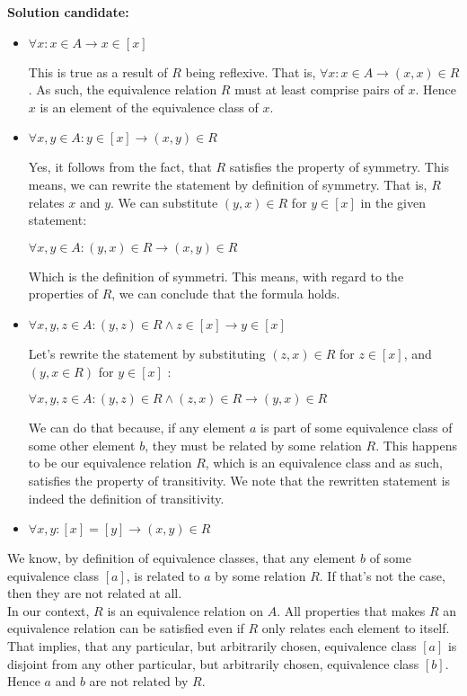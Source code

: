 \documentclass{report}
\newcommand{\cent}[1]{\begin{center}#1\end{center}}
\newcommand{\In}{\! \in \!}
\newcommand{\solution}{\textbf{Solution candidate: }}
\begin{document}
	\solution
	\begin{itemize}
		\item $\forall x : x \In A \to x \In [x]$
		
		This is true as a result of $R$ being reflexive. That is, $\forall x : x \In A \to (x,x) \In R$. As such, the equivalence relation $R$ must at least comprise pairs of $x$. Hence $x$ is an element of the equivalence class of $x$.
		
		\item $\forall x,y \In A : y \In [x] \to (x,y) \In R$
		
		Yes, it follows from the fact, that $R$ satisfies the property of symmetry. This means, we can rewrite the statement by definition of symmetry. That is, $R$ relates $x$ and $y$. We can substitute $(y,x)\In R$ for $y \In [x]$ in the given statement:
		
		\cent{$\forall x,y \In A : (y,x) \In R \to (x,y) \In R$}
		
		Which is the definition of symmetri. This means, with regard to the properties of $R$, we can conclude that the formula holds.
		
		\item $\forall x,y,z \In A : (y,z) \In R \wedge z \In [x] \to y \In [x]$
		
		Let's rewrite the statement by substituting $(z,x)\In R$ for $z \In [x]$, and $(y,x \In R)$ for $y \In [x]$ :
		
		\cent{$\forall x,y,z \In A : (y,z) \In R \wedge (z,x)\In R \to (y,x) \In R$}
		
		We can do that because, if any element $a$ is part of some equivalence class of some other element $b$, they must be related by some relation $R$. This happens to be our equivalence relation $R$, which is an equivalence class and as such, satisfies the property of transitivity. We note that the rewritten statement is indeed the definition of transitivity.
		
		\item $\forall x,y : [x] = [y] \to (x,y)\In R$
	\end{itemize}
		
	We know, by definition of equivalence classes, that any element $b$ of some equivalence class $[a]$, is related to $a$ by some relation $R$. If that's not the case, then they are not related at all.\\ 
	
	In our context, $R$ is an equivalence relation on $A$. All properties that makes $R$ an equivalence relation can be satisfied even if $R$ only relates each element to itself. That implies, that any particular, but arbitrarily chosen, equivalence class $[a]$ is disjoint from any other particular, but arbitrarily chosen, equivalence class $[b]$. Hence $a$ and $b$ are not related by $R$.\\
	
\end{document}
